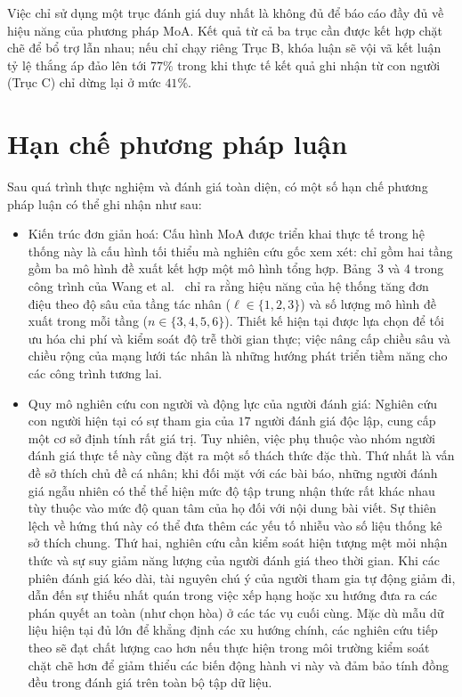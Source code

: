 Việc chỉ sử dụng một trục đánh giá duy nhất là không đủ để báo cáo đầy đủ về hiệu năng của phương pháp MoA. Kết quả từ cả ba trục cần được kết hợp chặt chẽ để bổ trợ lẫn nhau; nếu chỉ chạy riêng Trục B, khóa luận sẽ vội vã kết luận tỷ lệ thắng áp đảo lên tới $77\%$ trong khi thực tế kết quả ghi nhận từ con người (Trục C) chỉ dừng lại ở mức $41\%$.

\section{Hạn chế phương pháp luận}

Sau quá trình thực nghiệm và đánh giá toàn diện, có một số hạn chế phương pháp luận có thể ghi nhận như sau: 

\begin{itemize}
    \item Kiến trúc đơn giản hoá: Cấu hình MoA được triển khai thực tế trong hệ thống này là cấu hình tối thiểu mà nghiên cứu gốc xem xét: chỉ gồm hai tầng gồm ba mô hình đề xuất kết hợp một mô hình tổng hợp. Bảng~3 và 4 trong công trình của Wang et al.\ \cite{Wang2024} chỉ ra rằng hiệu năng của hệ thống tăng đơn điệu theo độ sâu của tầng tác nhân ($\ell \in \{1, 2, 3\}$) và số lượng mô hình đề xuất trong mỗi tầng ($n \in \{3, 4, 5, 6\}$). Thiết kế hiện tại được lựa chọn để tối ưu hóa chi phí và kiểm soát độ trễ thời gian thực; việc nâng cấp chiều sâu và chiều rộng của mạng lưới tác nhân là những hướng phát triển tiềm năng cho các công trình tương lai.
    \item Quy mô nghiên cứu con người và động lực của người đánh giá:
Nghiên cứu con người hiện tại có sự tham gia của $17$ người đánh giá độc lập, cung cấp một cơ sở định tính rất giá trị. Tuy nhiên, việc phụ thuộc vào nhóm người đánh giá thực tế này cũng đặt ra một số thách thức đặc thù. Thứ nhất là vấn đề sở thích chủ đề cá nhân; khi đối mặt với các bài báo, những người đánh giá ngẫu nhiên có thể thể hiện mức độ tập trung nhận thức rất khác nhau tùy thuộc vào mức độ quan tâm của họ đối với nội dung bài viết. Sự thiên lệch về hứng thú này có thể đưa thêm các yếu tố nhiễu vào số liệu thống kê sở thích chung.
Thứ hai, nghiên cứu cần kiểm soát hiện tượng mệt mỏi nhận thức và sự suy giảm năng lượng của người đánh giá theo thời gian. Khi các phiên đánh giá kéo dài, tài nguyên chú ý của người tham gia tự động giảm đi, dẫn đến sự thiếu nhất quán trong việc xếp hạng hoặc xu hướng đưa ra các phán quyết an toàn (như chọn hòa) ở các tác vụ cuối cùng. Mặc dù mẫu dữ liệu hiện tại đủ lớn để khẳng định các xu hướng chính, các nghiên cứu tiếp theo sẽ đạt chất lượng cao hơn nếu thực hiện trong môi trường kiểm soát chặt chẽ hơn để giảm thiểu các biến động hành vi này và đảm bảo tính đồng đều trong đánh giá trên toàn bộ tập dữ liệu.


\end{itemize}
